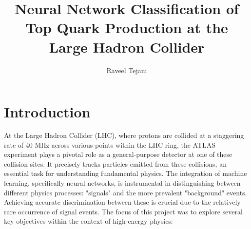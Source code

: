\documentclass[]{article}
\title{Neural Network Classification of Top Quark Production at the Large Hadron Collider }
\author{Raveel Tejani}
\date{\parbox{\linewidth}{\centering%
		\today\endgraf\bigskip\bigskip\bigskip\bigskip\bigskip\bigskip\bigskip\bigskip\bigskip\bigskip
		\bigskip\bigskip\bigskip\bigskip\bigskip\bigskip\bigskip\bigskip\bigskip
		PHYS 310 \endgraf\bigskip
		University of British Columbia}}
\begin{document}
\maketitle
\thispagestyle{empty}
\clearpage

\tableofcontents 
\thispagestyle{empty}
\clearpage

\listoftables
\thispagestyle{empty}
\clearpage
             
\listoffigures
\thispagestyle{empty}
\clearpage     

\section{Introduction}

At the Large Hadron Collider (LHC), where protons are collided at a staggering rate of 40 MHz across various points within the LHC ring, the ATLAS experiment plays a pivotal role as a general-purpose detector at one of these collision sites. It precisely tracks particles emitted from these collisions, an essential task for understanding fundamental physics. The integration of machine learning, specifically neural networks, is instrumental in distinguishing between different physics processes: "signals" and the more prevalent "background" events. Achieving accurate discrimination between these is crucial due to the relatively rare occurrence of signal events. The focus of this project was to explore several key objectives within the context of high-energy physics:
\end{document}
